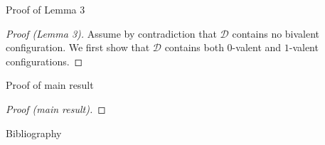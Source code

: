 \documentclass[12pt]{beamer}
\begin{document}
  \begin{frame}{Proof of Lemma 3}
    \begin{proof}[Proof (Lemma 3)]
      Assume by contradiction that \(\mathcal{D}\) contains no bivalent configuration. We first show that \(\mathcal{D}\) contains both \(0\)-valent and \(1\)-valent configurations.
    \end{proof}
  \end{frame}

  \begin{frame}{Proof of main result}
    \begin{proof}[Proof (main result)]
    \end{proof}
  \end{frame}

  \begin{frame}{Bibliography}
    
  \end{frame}
\end{document}
